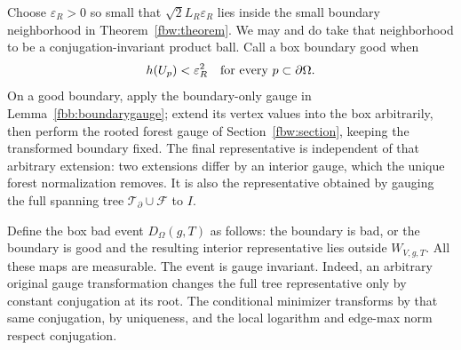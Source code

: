Choose \(\varepsilon_R>0\) so small that
\(\sqrt2 L_R\varepsilon_R\) lies inside the small boundary
neighborhood in Theorem~\ref{fbw:theorem}. We may and do take that
neighborhood to be a conjugation-invariant product ball. Call a
box boundary good when
\[
 h(U_p)<\varepsilon_R^2\quad\hbox{for every }p\subset\partial\Omega.
\]
On a good boundary, apply the boundary-only gauge in
Lemma~\ref{fbb:boundarygauge}; extend its vertex values into the
box arbitrarily, then perform the rooted forest gauge of
Section~\ref{fbw:section}, keeping the transformed boundary fixed.
The final representative is independent of that arbitrary extension:
two extensions differ by an interior gauge, which the unique forest
normalization removes. It is also the representative obtained by
gauging the full spanning tree
\(\mathcal T_\partial\cup\mathcal F\) to \(I\).

Define the box bad event \(D_\Omega(g,T)\) as follows:
the boundary is bad, or the boundary is good and the resulting
interior representative lies outside \(W_{V,g,T}\). All these maps
are measurable. The event is gauge invariant. Indeed, an arbitrary
original gauge transformation changes the full tree representative
only by constant conjugation at its root. The conditional minimizer
transforms by that same conjugation, by uniqueness, and the local
logarithm and edge-max norm respect conjugation.

